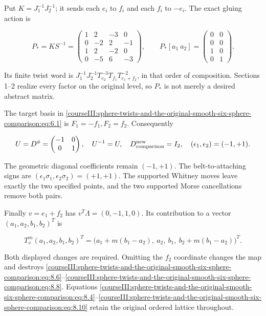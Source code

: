 Put \(K=J_1^{-1}J_2^{-1}\); it sends each \(e_i\) to \(f_i\) and each \(f_i\) to \(-e_i\). The exact gluing action is

\begin{equation}
P_*=KS^{-1}=
 \begin{pmatrix}
 1&2&-3&0\\
 0&-2&2&-1\\
 1&2&-2&0\\
 0&-5&6&-3
 \end{pmatrix},\qquad
 P_*[a_1\ a_2]=
 \begin{pmatrix}0&0\\0&0\\1&0\\0&1\end{pmatrix}.
 \label{courseIII:sphere-twists-and-the-original-smooth-six-sphere-comparison:eq:8.8}
\end{equation}

Its finite twist word is \(J_1^{-1}J_2^{-1}T_{e_2}^{-3}T_{f_1}T_{e_1+f_2}^{-2}\), in that order of composition. Sections 1--2 realize every factor on the original level, so \(P_*\) is not merely a desired abstract matrix.

The target basis in \eqref{courseIII:sphere-twists-and-the-original-smooth-six-sphere-comparison:eq:6.1} is \(F_1=-f_1,F_2=f_2\). Consequently

\begin{equation}
U=D^\phi=\begin{pmatrix}-1&0\\0&1\end{pmatrix},
 \quad U^{-1}=U,\quad D_{\rm comparison}^{\rm new}=I_2,
 \quad(\epsilon_1,\epsilon_2)=(-1,+1).
 \label{courseIII:sphere-twists-and-the-original-smooth-six-sphere-comparison:eq:8.9}
\end{equation}

The geometric diagonal coefficients remain \((-1,+1)\). The belt-to-attaching signs are \((\epsilon_1\sigma_1,\epsilon_2\sigma_2)=(+1,+1)\). The supported Whitney moves leave exactly the two specified points, and the two supported Morse cancellations remove both pairs.

Finally \(v=e_1+f_2\) has \(v^T\Lambda=(0,-1,1,0)\). Its contribution to a vector \((a_1,a_2,b_1,b_2)^T\) is

\begin{equation}
T_v^m(a_1,a_2,b_1,b_2)^T
 =\bigl(a_1+m(b_1-a_2),\ a_2,\ b_1,\
                         b_2+m(b_1-a_2)\bigr)^T .
 \label{courseIII:sphere-twists-and-the-original-smooth-six-sphere-comparison:eq:8.10}
\end{equation}

Both displayed changes are required. Omitting the \(f_2\) coordinate changes the map and destroys \eqref{courseIII:sphere-twists-and-the-original-smooth-six-sphere-comparison:eq:8.6}--\eqref{courseIII:sphere-twists-and-the-original-smooth-six-sphere-comparison:eq:8.8}. Equations \eqref{courseIII:sphere-twists-and-the-original-smooth-six-sphere-comparison:eq:8.4}--\eqref{courseIII:sphere-twists-and-the-original-smooth-six-sphere-comparison:eq:8.10} retain the original ordered lattice throughout.
